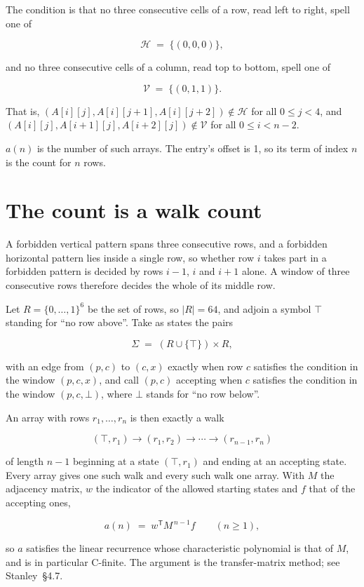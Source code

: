 \documentclass[11pt]{article}
\theoremstyle{definition}
\begin{document}
The condition is that no three consecutive cells of a row, read left to right, spell one of

\[\mathcal{H} \;=\; \{(0,0,0)\},\]

and no three consecutive cells of a column, read top to bottom, spell one of

\[\mathcal{V} \;=\; \{(0,1,1)\}.\]

That is, $(A[i][j],A[i][j{+}1],A[i][j{+}2]) \notin \mathcal{H}$ for all $0 \le j < 4$, and $(A[i][j],A[i{+}1][j],A[i{+}2][j]) \notin \mathcal{V}$ for all $0 \le i < n-2$.

$a(n)$ is the number of such arrays. The entry's offset is 1, so its term of index $n$ is the count for $n$ rows.

\section{The count is a walk count}

A forbidden vertical pattern spans three consecutive rows, and a forbidden horizontal pattern lies inside a single row, so whether row $i$ takes part in a forbidden pattern is decided by rows $i-1$, $i$ and $i+1$ alone. A window of three consecutive rows therefore decides the whole of its middle row.

Let $R = \{0,\dots,1\}^{6}$ be the set of rows, so $|R| = 64$, and adjoin a symbol $\top$ standing for ``no row above''. Take as states the pairs

\[\Sigma \;=\; (R \cup \{\top\}) \times R,\]

with an edge from $(p,c)$ to $(c,x)$ exactly when row $c$ satisfies the condition in the window $(p,c,x)$, and call $(p,c)$ accepting when $c$ satisfies the condition in the window $(p,c,\bot)$, where $\bot$ stands for ``no row below''.

An array with rows $r_1,\dots,r_n$ is then exactly a walk

\[(\top,r_1) \to (r_1,r_2) \to \cdots \to (r_{n-1},r_n)\]

of length $n-1$ beginning at a state $(\top,r_1)$ and ending at an accepting state. Every array gives one such walk and every such walk one array. With $M$ the adjacency matrix, $w$ the indicator of the allowed starting states and $f$ that of the accepting ones,

\[a(n) \;=\; w^{\mathsf T} M^{\,n-1} f \qquad (n \ge 1),\]

so $a$ satisfies the linear recurrence whose characteristic polynomial is that of $M$, and is in particular C-finite. The argument is the transfer-matrix method; see Stanley~\S4.7.
\end{document}
